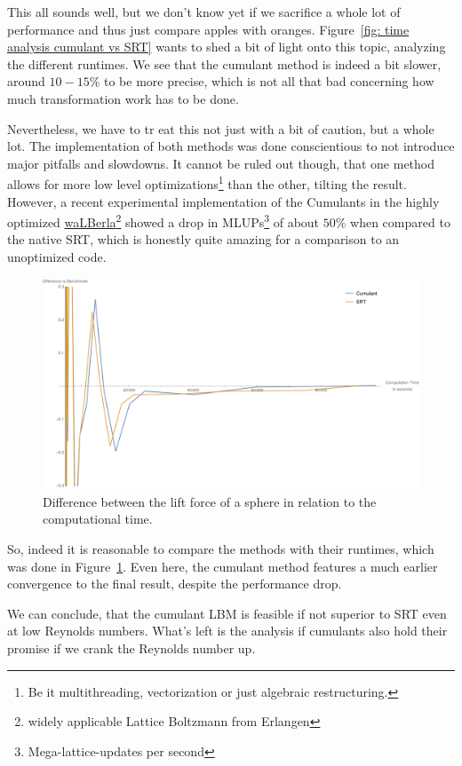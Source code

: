 This all sounds well, but we don't know yet if we sacrifice a whole lot of performance and thus just compare apples with oranges.
Figure~\ref{fig: time analysis cumulant vs SRT} wants to shed a bit of light onto this topic, analyzing the different runtimes.
We see that the cumulant method is indeed a bit slower, around $10-15\%$ to be more precise, which is not all that bad concerning how much transformation work has to be done.

Nevertheless, we have to tr eat this not just with a bit of caution, but a whole lot.
The implementation of both methods was done conscientious to not introduce major pitfalls and slowdowns.
It cannot be ruled out though, that one method allows for more low level optimizations\footnote{Be it multithreading, vectorization or just algebraic restructuring.} than the other, tilting the result.
However, a recent experimental implementation of the Cumulants in the highly optimized \href{http://walberla.net/index.html}{waLBerla}\footnote{widely applicable Lattice Boltzmann from Erlangen} showed a drop in MLUPs\footnote{Mega-lattice-updates per second} of about $50\%$ when compared to the native SRT, which is honestly quite amazing for a comparison to an unoptimized code.

\begin{figure}
  \centering
  \includegraphics[width=\linewidth]{../figures/schaeferTurekLift_timeDifference.pdf} %
  \caption{Difference between the lift force of a sphere in relation to the computational time.}
\label{fig: schaefer turek time difference}
\end{figure}

So, indeed it is reasonable to compare the methods with their runtimes, which was done in Figure~\ref{fig: schaefer turek time difference}.
Even here, the cumulant method features a much earlier convergence to the final result, despite the performance drop.


We can conclude, that the cumulant LBM is feasible if not superior to SRT even at low Reynolds numbers.
What's left is the analysis if cumulants also hold their promise if we crank the Reynolds number up.
